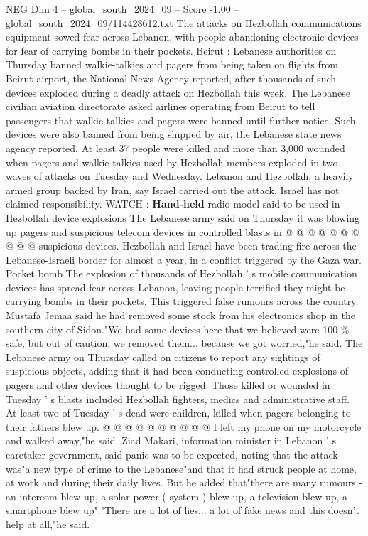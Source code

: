 \begin{textsample}{NEG Dim 4 – global\_south\_2024\_09 – Score -1.00 – global\_south\_2024\_09/114428612.txt}  \label{ex:f4_neg_164}
The attacks on Hezbollah communications equipment sowed fear across Lebanon, with people abandoning electronic devices for fear of carrying bombs in their pockets.
Beirut : Lebanese authorities on Thursday banned walkie-talkies and pagers from being taken on flights from Beirut airport, the National News Agency reported, after thousands of such devices exploded during a deadly attack on Hezbollah this week.
The Lebanese civilian aviation directorate asked airlines operating from Beirut to tell passengers that walkie-talkies and pagers were banned until further notice.
Such devices were also banned from being shipped by air, the Lebanese state news agency reported.
At least 37 people were killed and more than 3,000 wounded when pagers and walkie-talkies used by Hezbollah members exploded in two waves of attacks on Tuesday and Wednesday.
Lebanon and Hezbollah, a heavily armed group backed by Iran, say Israel carried out the attack.
Israel has not claimed responsibility.
WATCH : \textbf{Hand-held} radio model said to be used in Hezbollah device explosions The Lebanese army said on Thursday it was blowing up pagers and suspicious telecom devices in controlled blasts in @ @ @ @ @ @ @ @ @ @ suspicious devices.
Hezbollah and Israel have been trading fire across the Lebanese-Israeli border for almost a year, in a conflict triggered by the Gaza war.
Pocket bomb The explosion of thousands of Hezbollah ' s mobile communication devices has spread fear across Lebanon, leaving people terrified they might be carrying bombs in their pockets.
This triggered false rumours across the country.
Mustafa Jemaa said he had removed some stock from his electronics shop in the southern city of Sidon."We had some devices here that we believed were 100 \% safe, but out of caution, we removed them... because we got worried,"he said.
The Lebanese army on Thursday called on citizens to report any sightings of suspicious objects, adding that it had been conducting controlled explosions of pagers and other devices thought to be rigged.
Those killed or wounded in Tuesday ' s blasts included Hezbollah fighters, medics and administrative staff.
At least two of Tuesday ' s dead were children, killed when pagers belonging to their fathers blew up. @ @ @ @ @ @ @ @ @ @ I left my phone on my motorcycle and walked away,"he said.
Ziad Makari, information minister in Lebanon ' s caretaker government, said panic was to be expected, noting that the attack was"a new type of crime to the Lebanese"and that it had struck people at home, at work and during their daily lives.
But he added that"there are many rumours - an intercom blew up, a solar power ( system ) blew up, a television blew up, a smartphone blew up"."There are a lot of lies... a lot of fake news and this doesn't help at all,"he said.

\end{textsample}
